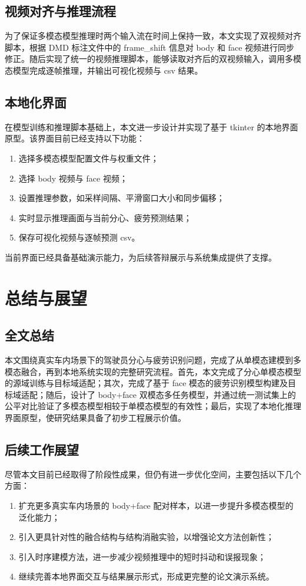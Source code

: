 \documentclass[12pt]{ctexrep}
\begin{document}
\section{视频对齐与推理流程}
为了保证多模态模型推理时两个输入流在时间上保持一致，本文实现了双视频对齐脚本，根据 DMD 标注文件中的 frame\_shift 信息对 body 和 face 视频进行同步修正。随后实现了统一的视频推理脚本，能够读取对齐后的双视频输入，调用多模态模型完成逐帧推理，并输出可视化视频与 csv 结果。

\section{本地化界面}
在模型训练和推理脚本基础上，本文进一步设计并实现了基于 tkinter 的本地界面原型。该界面目前已经支持以下功能：

\begin{enumerate}
    \item 选择多模态模型配置文件与权重文件；
    \item 选择 body 视频与 face 视频；
    \item 设置推理参数，如采样间隔、平滑窗口大小和同步偏移；
    \item 实时显示推理画面与当前分心、疲劳预测结果；
    \item 保存可视化视频与逐帧预测 csv。
\end{enumerate}

当前界面已经具备基础演示能力，为后续答辩展示与系统集成提供了支撑。

\chapter{总结与展望}

\section{全文总结}
本文围绕真实车内场景下的驾驶员分心与疲劳识别问题，完成了从单模态建模到多模态融合，再到本地系统实现的完整研究流程。首先，本文完成了分心单模态模型的源域训练与目标域适配；其次，完成了基于 face 模态的疲劳识别模型构建及目标域适配；随后，设计了 body+face 双模态多任务模型，并通过统一测试集上的公平对比验证了多模态模型相较于单模态模型的有效性；最后，实现了本地化推理界面原型，使研究结果具备了初步工程展示价值。

\section{后续工作展望}
尽管本文目前已经取得了阶段性成果，但仍有进一步优化空间，主要包括以下几个方面：

\begin{enumerate}
    \item 扩充更多真实车内场景的 body+face 配对样本，以进一步提升多模态模型的泛化能力；
    \item 引入更具针对性的融合结构与结构消融实验，以增强论文方法创新性；
    \item 引入时序建模方法，进一步减少视频推理中的短时抖动和误报现象；
    \item 继续完善本地界面交互与结果展示形式，形成更完整的论文演示系统。
\end{enumerate}
\end{document}
